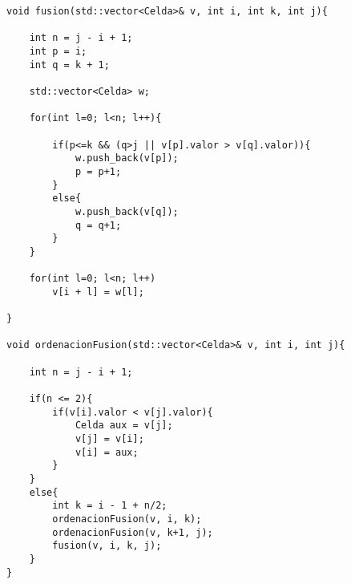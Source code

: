\begin{lstlisting}
void fusion(std::vector<Celda>& v, int i, int k, int j){
	
	int n = j - i + 1;
	int p = i;
	int q = k + 1;
	
	std::vector<Celda> w;
	
	for(int l=0; l<n; l++){
		
		if(p<=k && (q>j || v[p].valor > v[q].valor)){
			w.push_back(v[p]);
			p = p+1;
		}
		else{
			w.push_back(v[q]);
			q = q+1;	
		}
	}
	
	for(int l=0; l<n; l++)
		v[i + l] = w[l];
	
}

void ordenacionFusion(std::vector<Celda>& v, int i, int j){

	int n = j - i + 1; 
	
 	if(n <= 2){
		if(v[i].valor < v[j].valor){
			Celda aux = v[j];
			v[j] = v[i];
			v[i] = aux;
		}
	}
	else{
		int k = i - 1 + n/2;
		ordenacionFusion(v, i, k);
		ordenacionFusion(v, k+1, j);
		fusion(v, i, k, j);
	} 
}
\end{lstlisting}